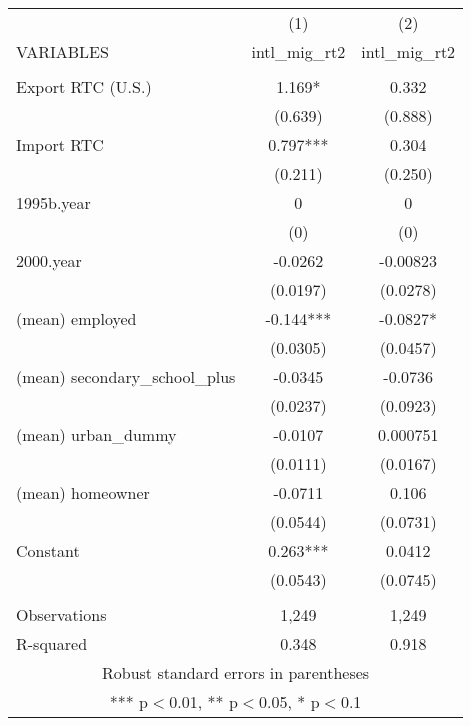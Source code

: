 \begin{tabular}{lcc} \hline
 & (1) & (2) \\
VARIABLES & intl\_mig\_rt2 & intl\_mig\_rt2 \\ \hline
 &  &  \\
Export RTC (U.S.) & 1.169* & 0.332 \\
 & (0.639) & (0.888) \\
Import RTC & 0.797*** & 0.304 \\
 & (0.211) & (0.250) \\
1995b.year & 0 & 0 \\
 & (0) & (0) \\
2000.year & -0.0262 & -0.00823 \\
 & (0.0197) & (0.0278) \\
(mean) employed & -0.144*** & -0.0827* \\
 & (0.0305) & (0.0457) \\
(mean) secondary\_school\_plus & -0.0345 & -0.0736 \\
 & (0.0237) & (0.0923) \\
(mean) urban\_dummy & -0.0107 & 0.000751 \\
 & (0.0111) & (0.0167) \\
(mean) homeowner & -0.0711 & 0.106 \\
 & (0.0544) & (0.0731) \\
Constant & 0.263*** & 0.0412 \\
 & (0.0543) & (0.0745) \\
 &  &  \\
Observations & 1,249 & 1,249 \\
 R-squared & 0.348 & 0.918 \\ \hline
\multicolumn{3}{c}{ Robust standard errors in parentheses} \\
\multicolumn{3}{c}{ *** p$<$0.01, ** p$<$0.05, * p$<$0.1} \\
\end{tabular}
